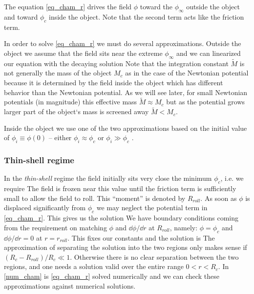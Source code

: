 The equation \eqref{eq_cham_r} drives the field $\phi$ toward the $\phi_\infty$ outside the object and toward $\phi_c$ inside the object. Note that the second term acts like the friction term.

In order to solve \eqref{eq_cham_r} we must do several approximations. Outside the object we assume that the field sits near the extreme $\phi_\infty$ and we can linearized our equation
with the decaying solution
Note that the integration constant $\tilde{M}$ is not generally the mass of the object $M_c$ as in the case of the Newtonian potential because it is determined by the field inside the object which has different behavior than the Newtonian potential. As we will see later, for small Newtonian potentials (in magnitude) this effective mass $\tilde{M}\approx M_c$ but as the potential grows larger part of the object`s mass is screened away $\tilde{M}< M_c$.

Inside the object we use one of the two approximations based on the initial value of $\phi_i\equiv\phi(0)$ -- either $\phi_i\approx\phi_c$ or $\phi_i\gg\phi_c$ .
\subsubsection{Thin-shell regime}
In the \textit{thin-shell} regime the field initially sits very close the minimum $\phi_c$, i.e. we require
The field is frozen near this value until the friction term is sufficiently small to allow the field to roll. This ``moment'' is denoted by $R_{roll}$. As soon as $\phi$ is displaced significantly from $\phi_c$ we may neglect the potential term in \eqref{eq_cham_r}. This gives us the solution
We have boundary conditions coming from the requirement on matching $\phi$ and  $\dd\phi/\dd r$ at $R_{roll}$, namely: $\phi=\phi_c$ and $\dd\phi/\dd r=0$ at $r=r_{roll}$. This fixes our constants and the solution is
The approximation of separating the solution into the two regions only makes sense if $(R_c-R_{roll})/R_c\ll1$. Otherwise there is no clear separation between the two regions, and one needs a solution valid over the entire range $0<r<R_c$. In \autoref{num_cham} is \eqref{eq_cham_r} solved numerically and we can check these approximations against numerical solutions.

